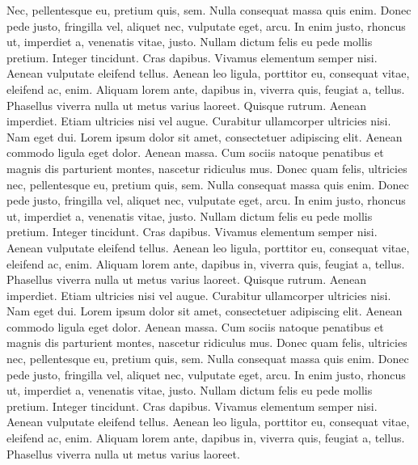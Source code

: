 \documentclass[
    12pt,
    letterpaper,
    oneside,
    noraggedright
]{turabian-researchpaper}
\begin{document}
Nec, pellentesque eu, pretium quis, sem. Nulla consequat massa quis
enim. Donec pede justo, fringilla vel, aliquet nec, vulputate eget,
arcu. In enim justo, rhoncus ut, imperdiet a, venenatis vitae, justo.
Nullam dictum felis eu pede mollis pretium. Integer tincidunt. Cras
dapibus. Vivamus elementum semper nisi. Aenean vulputate eleifend
tellus. Aenean leo ligula, porttitor eu, consequat vitae, eleifend ac,
enim. Aliquam lorem ante, dapibus in, viverra quis, feugiat a, tellus.
Phasellus viverra nulla ut metus varius laoreet. Quisque rutrum. Aenean
imperdiet. Etiam ultricies nisi vel augue. Curabitur ullamcorper
ultricies nisi. Nam eget dui. Lorem ipsum dolor sit amet, consectetuer
adipiscing elit. Aenean commodo ligula eget dolor. Aenean massa. Cum
sociis natoque penatibus et magnis dis parturient montes, nascetur
ridiculus mus. Donec quam felis, ultricies nec, pellentesque eu, pretium
quis, sem. Nulla consequat massa quis enim. Donec pede justo, fringilla
vel, aliquet nec, vulputate eget, arcu. In enim justo, rhoncus ut,
imperdiet a, venenatis vitae, justo. Nullam dictum felis eu pede mollis
pretium. Integer tincidunt. Cras dapibus. Vivamus elementum semper nisi.
Aenean vulputate eleifend tellus. Aenean leo ligula, porttitor eu,
consequat vitae, eleifend ac, enim. Aliquam lorem ante, dapibus in,
viverra quis, feugiat a, tellus. Phasellus viverra nulla ut metus varius
laoreet. Quisque rutrum. Aenean imperdiet. Etiam ultricies nisi vel
augue. Curabitur ullamcorper ultricies nisi. Nam eget dui. Lorem ipsum
dolor sit amet, consectetuer adipiscing elit. Aenean commodo ligula eget
dolor. Aenean massa. Cum sociis natoque penatibus et magnis dis
parturient montes, nascetur ridiculus mus. Donec quam felis, ultricies
nec, pellentesque eu, pretium quis, sem. Nulla consequat massa quis
enim. Donec pede justo, fringilla vel, aliquet nec, vulputate eget,
arcu. In enim justo, rhoncus ut, imperdiet a, venenatis vitae, justo.
Nullam dictum felis eu pede mollis pretium. Integer tincidunt. Cras
dapibus. Vivamus elementum semper nisi. Aenean vulputate eleifend
tellus. Aenean leo ligula, porttitor eu, consequat vitae, eleifend ac,
enim. Aliquam lorem ante, dapibus in, viverra quis, feugiat a, tellus.
Phasellus viverra nulla ut metus varius laoreet.
\end{document}
